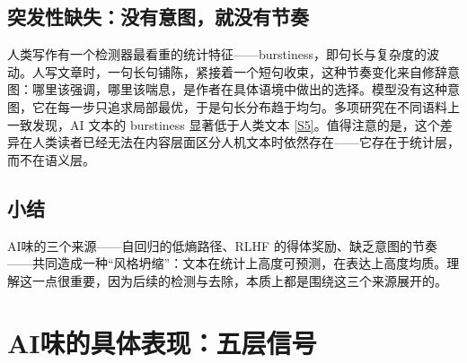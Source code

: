 \documentclass[10pt,a4paper]{ctexart}
\begin{document}
\begin{justifying}
\subsection{突发性缺失：没有意图，就没有节奏}

人类写作有一个检测器最看重的统计特征——burstiness，即句长与复杂度的波动。人写文章时，一句长句铺陈，紧接着一个短句收束，这种节奏变化来自修辞意图：哪里该强调，哪里该喘息，是作者在具体语境中做出的选择。模型没有这种意图，它在每一步只追求局部最优，于是句长分布趋于均匀。多项研究在不同语料上一致发现，AI 文本的 burstiness 显著低于人类文本 \href{https://esiconf.org/index.php/AMSI/article/download/9045/9021/17384}{[S5]}。值得注意的是，这个差异在人类读者已经无法在内容层面区分人机文本时依然存在——它存在于统计层，而不在语义层。

\subsection{小结}

AI味的三个来源——自回归的低熵路径、RLHF 的得体奖励、缺乏意图的节奏——共同造成一种“风格坍缩”：文本在统计上高度可预测，在表达上高度均质。理解这一点很重要，因为后续的检测与去除，本质上都是围绕这三个来源展开的。

\end{justifying}

\section{AI味的具体表现：五层信号}
\end{document}
